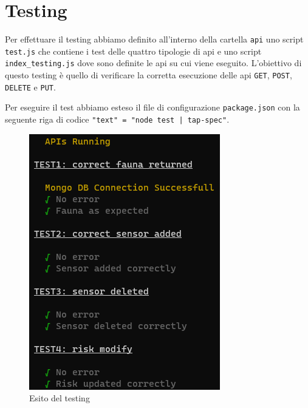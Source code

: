 \chapter{Testing}
Per effettuare il testing abbiamo definito all'interno della cartella \texttt{api} uno script \texttt{test.js} che contiene i test delle quattro tipologie di api e uno script \texttt{index\_testing.js} dove sono definite le api su cui viene eseguito. L'obiettivo di questo testing è quello di verificare la corretta esecuzione delle api \texttt{GET}, \texttt{POST}, \texttt{DELETE} e \texttt{PUT}.

\vspace{5mm}
Per eseguire il test abbiamo esteso il file di configurazione \texttt{package.json} con la seguente riga di codice \texttt{"text" = "node test | tap-spec"}.

\begin{figure}[ht]
    \centering
    \includegraphics[scale=0.7]{Img/testing_result.png}
    \caption{Esito del testing}
\end{figure}